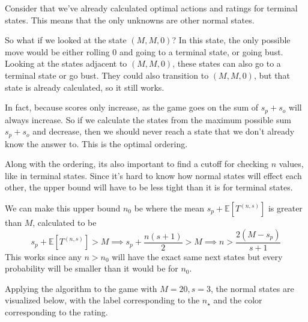 \documentclass[a4paper]{article}
\begin{document}
Consider that we've already calculated optimal actions and ratings for terminal states. This means that the only unknowns are other normal states. 

So what if we looked at the state $(M, M, 0)$? In this state, the only possible move would be either rolling $0$ and going to a terminal state, or going bust. Looking at the states adjacent to $(M, M, 0)$, these states can also go to a terminal state or go bust. They could also transition to $(M, M, 0)$, but that state is already calculated, so it still works. 

In fact, because scores only increase, as the game goes on the sum of $s_p + s_o$ will always increase. So if we calculate the states from the maximum possible sum $s_p + s_o$ and decrease, then we should never reach a state that we don't already know the answer to. This is the optimal ordering.


Along with the ordering, its also important to find a cutoff for checking $n$ values, like in terminal states. Since it's hard to know how normal states will effect each other, the upper bound will have to be less tight than it is for terminal states. 

We can make this upper bound $n_0$ be where the mean $s_p + \mathbb{E}[T^{(n, s)}]$ is greater than $M$, calculated to be
%
$$
s_p + \mathbb{E}[T^{(n, s)}] > M \implies s_p + \frac{n(s+1)}{2} > M \implies n > \frac{2(M - s_p)}{s+1}
$$
%
This works since any $n > n_0$ will have the exact same next states but every probability will be smaller than it would be for $n_0$. \newline


Applying the algorithm to the game with $M = 20, s = 3$, the normal states are visualized below, with the label corresponding to the $n_{\star}$ and the color corresponding to the rating.
\end{document}
